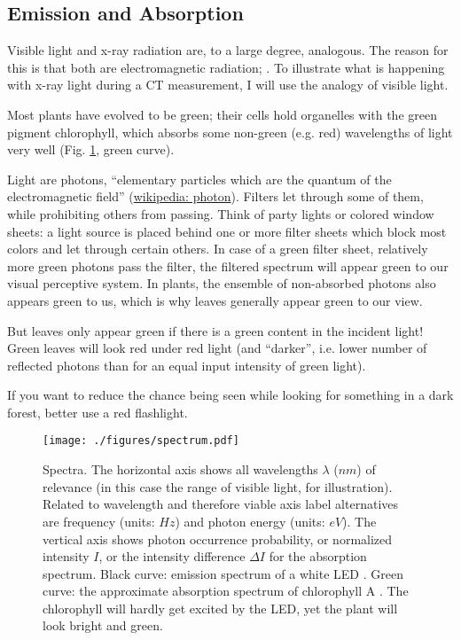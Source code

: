 \subsection{Emission and Absorption}
\label{sec:org6b83a6b}
Visible light and x-ray radiation are, to a large degree, analogous.
The reason for this is that both are electromagnetic radiation; .
To illustrate what is happening with x-ray light during a CT measurement, I will use the analogy of visible light.



Most plants have evolved to be green; their cells hold organelles with the green pigment chlorophyll, which absorbs some non-green (e.g. red) wavelengths of light very well (Fig. \ref{fig:spectrum}, green curve).
\begin{change}
Light are photons, ``elementary particles which are the quantum of the electromagnetic field'' (\href{https://en.wikipedia.org/wiki/Photon}{wikipedia: photon}).
Filters let through some of them, while prohibiting others from passing.
Think of party lights or colored window sheets: a light source is placed behind one or more filter sheets which block most colors and let through certain others.
In case of a green filter sheet, relatively more green photons pass the filter, the filtered spectrum will appear green to our visual perceptive system.
In plants, the ensemble of non-absorbed photons also appears green to us, which is why leaves generally appear green to our view.
\end{change}
But leaves only appear green if there is a green content in the incident light!
Green leaves will look red under red light (and ``darker'', i.e. lower number of reflected photons than for an equal input intensity of green light).
\begin{change}
If you want to reduce the chance being seen while looking for something in a dark forest, better use a red flashlight.
\end{change}


\begin{figure}[p]
\centering
\texttt{[image: ./figures/spectrum.pdf]}
\caption{\label{fig:spectrum}Spectra. The horizontal axis shows all wavelengths \(\lambda\) (\(nm\)) of relevance (in this case the range of visible light, for illustration). Related to wavelength and therefore viable axis label alternatives are frequency (units: \(Hz\)) and photon energy (units: \(eV\)). The vertical axis shows photon occurrence probability, or normalized intensity \(I\), or the intensity difference \(\Delta I\) for the absorption spectrum. Black curve: emission spectrum of a white LED \citep{Tanabe2005}. Green curve: the approximate absorption spectrum of chlorophyll A \citep{Zscheile1934}. The chlorophyll will hardly get excited by the LED, yet the plant will look bright and green.}
\end{figure}


